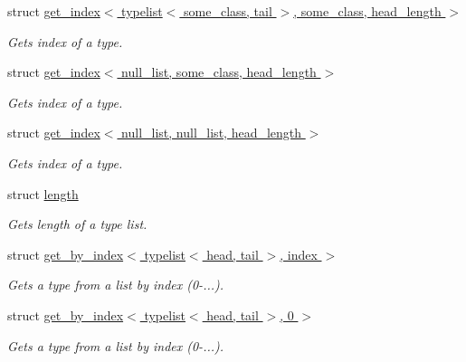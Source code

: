 \begin{DoxyCompactItemize}
struct \hyperlink{structavrpp_1_1typelist_1_1get__index_3_01typelist_3_01some__class_00_01tail_01_4_00_01some__class_00_01head__length_01_4}{get\_\-index$<$ typelist$<$ some\_\-class, tail $>$, some\_\-class, head\_\-length $>$}
\begin{DoxyCompactList}\small\item\em Gets index of a type. \item\end{DoxyCompactList}\item 
struct \hyperlink{structavrpp_1_1typelist_1_1get__index_3_01null__list_00_01some__class_00_01head__length_01_4}{get\_\-index$<$ null\_\-list, some\_\-class, head\_\-length $>$}
\begin{DoxyCompactList}\small\item\em Gets index of a type. \item\end{DoxyCompactList}\item 
struct \hyperlink{structavrpp_1_1typelist_1_1get__index_3_01null__list_00_01null__list_00_01head__length_01_4}{get\_\-index$<$ null\_\-list, null\_\-list, head\_\-length $>$}
\begin{DoxyCompactList}\small\item\em Gets index of a type. \item\end{DoxyCompactList}\item 
struct \hyperlink{structavrpp_1_1typelist_1_1length}{length}
\begin{DoxyCompactList}\small\item\em Gets length of a type list. \item\end{DoxyCompactList}\item 
struct \hyperlink{structavrpp_1_1typelist_1_1get__by__index_3_01typelist_3_01head_00_01tail_01_4_00_01index_01_4}{get\_\-by\_\-index$<$ typelist$<$ head, tail $>$, index $>$}
\begin{DoxyCompactList}\small\item\em Gets a type from a list by index (0-\/...). \item\end{DoxyCompactList}\item 
struct \hyperlink{structavrpp_1_1typelist_1_1get__by__index_3_01typelist_3_01head_00_01tail_01_4_00_010_01_4}{get\_\-by\_\-index$<$ typelist$<$ head, tail $>$, 0 $>$}
\begin{DoxyCompactList}\small\item\em Gets a type from a list by index (0-\/...). \item\end{DoxyCompactList}\item 

\end{DoxyCompactItemize}
